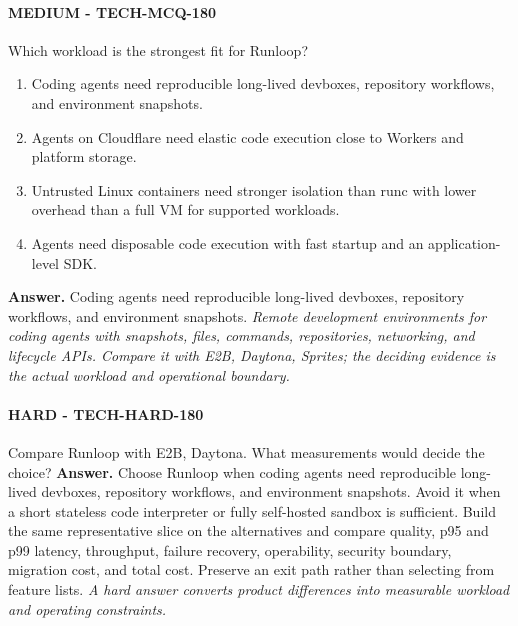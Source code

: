 \paragraph{MEDIUM - TECH-MCQ-180} Which workload is the strongest fit for Runloop?
\begin{enumerate}[label=\Alph*.]
\item Coding agents need reproducible long-lived devboxes, repository workflows, and environment snapshots.
\item Agents on Cloudflare need elastic code execution close to Workers and platform storage.
\item Untrusted Linux containers need stronger isolation than runc with lower overhead than a full VM for supported workloads.
\item Agents need disposable code execution with fast startup and an application-level SDK.
\end{enumerate}
\textbf{Answer.} Coding agents need reproducible long-lived devboxes, repository workflows, and environment snapshots.
\textit{Remote development environments for coding agents with snapshots, files, commands, repositories, networking, and lifecycle APIs. Compare it with E2B, Daytona, Sprites; the deciding evidence is the actual workload and operational boundary.}
\paragraph{HARD - TECH-HARD-180} Compare Runloop with E2B, Daytona. What measurements would decide the choice?
\textbf{Answer.} Choose Runloop when coding agents need reproducible long-lived devboxes, repository workflows, and environment snapshots. Avoid it when a short stateless code interpreter or fully self-hosted sandbox is sufficient. Build the same representative slice on the alternatives and compare quality, p95 and p99 latency, throughput, failure recovery, operability, security boundary, migration cost, and total cost. Preserve an exit path rather than selecting from feature lists.
\textit{A hard answer converts product differences into measurable workload and operating constraints.}
